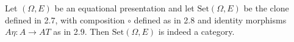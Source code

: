 Let $(\Omega, E)$ be an equational presentation and let $\text{Set}(\Omega, E)$ be the clone defined in 2.7, with composition $\circ$ defined as in 2.8 and identity morphisms $A\eta: A \to AT$ as in 2.9. Then $\text{Set}(\Omega, E)$ is indeed a category.
